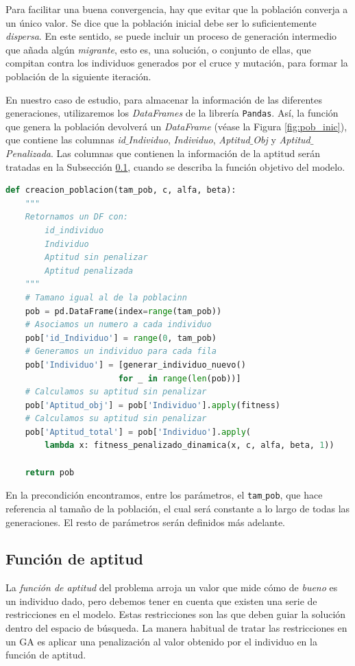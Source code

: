 \documentclass[12pt,a4paper]{book}
\begin{document}
Para facilitar una buena convergencia, hay que evitar que la población converja a un único valor. Se dice que la población inicial debe ser lo suficientemente \textsl{dispersa}. En este sentido, se puede incluir un proceso de generación intermedio que añada algún \textsl{migrante}, esto es, una solución, o conjunto de ellas, que compitan contra los individuos generados por el cruce y mutación, para formar la población de la siguiente iteración. 

En nuestro caso de estudio, para almacenar la información de las diferentes generaciones, utilizaremos los \textsl{DataFrames} de la librería \texttt{Pandas}. Así, la función que genera la población devolverá un \textsl{DataFrame} (véase la Figura \ref{fig:pob_inic}), que contiene las columnas \textsl{id$\_$Individuo}, \textsl{Individuo}, \textsl{Aptitud$\_$Obj} y \textsl{Aptitud$\_$Penalizada}. Las columnas que contienen la información de la aptitud serán tratadas en la Subsección \ref{Subsec: 4_1_3}, cuando se describa la función objetivo del modelo.
 
\begin{lstlisting}[language=Python, caption={Función para crear la población.}, label={lst:crear_pob}]
def creacion_poblacion(tam_pob, c, alfa, beta):
    """
  	Retornamos un DF con: 
  		id_individuo
  		Individuo 
  		Aptitud sin penalizar 
  		Aptitud penalizada
    """
    # Tamano igual al de la poblacinn
    pob = pd.DataFrame(index=range(tam_pob))
	# Asociamos un numero a cada individuo    
    pob['id_Individuo'] = range(0, tam_pob)
	# Generamos un individuo para cada fila    
    pob['Individuo'] = [generar_individuo_nuevo() 
                       for _ in range(len(pob))]
	# Calculamos su aptitud sin penalizar     
    pob['Aptitud_obj'] = pob['Individuo'].apply(fitness)
	# Calculamos su aptitud sin penalizar    
    pob['Aptitud_total'] = pob['Individuo'].apply(
        lambda x: fitness_penalizado_dinamica(x, c, alfa, beta, 1))

    return pob
\end{lstlisting}

En la precondición encontramos, entre los parámetros, el \texttt{tam$\_$pob}, que hace referencia al tamaño de la población, el cual será constante a lo largo de todas las generaciones. El resto de parámetros serán definidos más adelante. 

\subsection{Función de aptitud} \label{Subsec: 4_1_3}
La \textsl{función de aptitud} del problema arroja un valor que mide cómo de \textsl{bueno} es un individuo dado, pero debemos tener en cuenta que existen una serie de restricciones en el modelo. Estas restricciones son las que deben guiar la solución dentro del espacio de búsqueda. La manera habitual de tratar las restricciones en un GA es aplicar una penalización al valor obtenido por el individuo en la función de aptitud.
\end{document}
